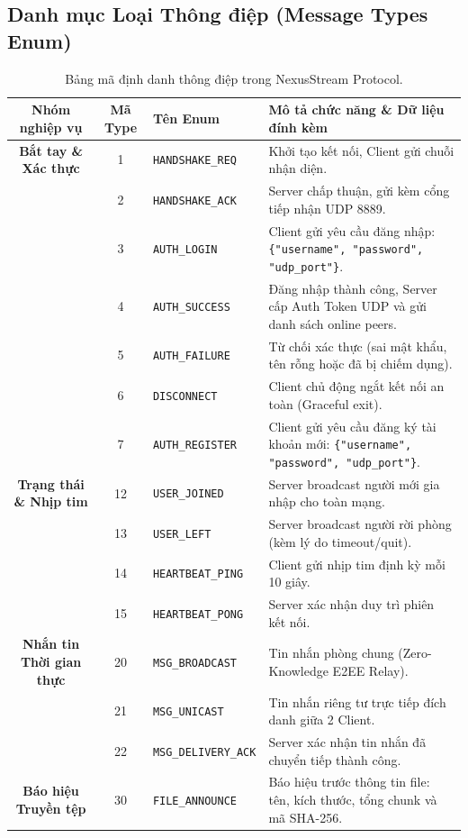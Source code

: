 \documentclass[11pt,a4paper]{article}
\begin{document}
\subsection{Danh mục Loại Thông điệp (Message Types Enum)}
\begin{table}[htbp]
\centering
\small
\begin{tabular}{cclp{7.5cm}}
\toprule
\rowcolor{headergray}
\textbf{Nhóm nghiệp vụ} & \textbf{Mã Type} & \textbf{Tên Enum} & \textbf{Mô tả chức năng \& Dữ liệu đính kèm} \\
\midrule
\textbf{Bắt tay \& Xác thực} & 1 & \texttt{HANDSHAKE\_REQ} & Khởi tạo kết nối, Client gửi chuỗi nhận diện. \\
& 2 & \texttt{HANDSHAKE\_ACK} & Server chấp thuận, gửi kèm cổng tiếp nhận UDP 8889. \\
& 3 & \texttt{AUTH\_LOGIN} & Client gửi yêu cầu đăng nhập: \texttt{\{"username", "password", "udp\_port"\}}. \\
& 4 & \texttt{AUTH\_SUCCESS} & Đăng nhập thành công, Server cấp Auth Token UDP và gửi danh sách online peers. \\
& 5 & \texttt{AUTH\_FAILURE} & Từ chối xác thực (sai mật khẩu, tên rỗng hoặc đã bị chiếm dụng). \\
& 6 & \texttt{DISCONNECT} & Client chủ động ngắt kết nối an toàn (Graceful exit). \\
& 7 & \texttt{AUTH\_REGISTER} & Client gửi yêu cầu đăng ký tài khoản mới: \texttt{\{"username", "password", "udp\_port"\}}. \\
\midrule
\textbf{Trạng thái \& Nhịp tim} & 12 & \texttt{USER\_JOINED} & Server broadcast người mới gia nhập cho toàn mạng. \\
& 13 & \texttt{USER\_LEFT} & Server broadcast người rời phòng (kèm lý do timeout/quit). \\
& 14 & \texttt{HEARTBEAT\_PING} & Client gửi nhịp tim định kỳ mỗi 10 giây. \\
& 15 & \texttt{HEARTBEAT\_PONG} & Server xác nhận duy trì phiên kết nối. \\
\midrule
\textbf{Nhắn tin Thời gian thực} & 20 & \texttt{MSG\_BROADCAST} & Tin nhắn phòng chung (Zero-Knowledge E2EE Relay). \\
& 21 & \texttt{MSG\_UNICAST} & Tin nhắn riêng tư trực tiếp đích danh giữa 2 Client. \\
& 22 & \texttt{MSG\_DELIVERY\_ACK} & Server xác nhận tin nhắn đã chuyển tiếp thành công. \\
\midrule
\textbf{Báo hiệu Truyền tệp} & 30 & \texttt{FILE\_ANNOUNCE} & Báo hiệu trước thông tin file: tên, kích thước, tổng chunk và mã SHA-256. \\
\bottomrule
\end{tabular}
\caption{Bảng mã định danh thông điệp trong NexusStream Protocol.}
\label{tab:msg_types}
\end{table}
\end{document}
